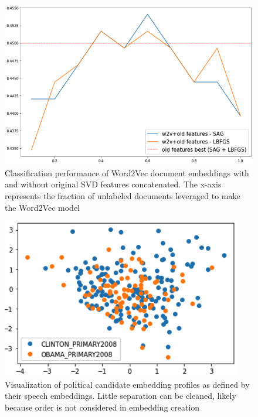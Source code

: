 \documentclass[11pt,a4paper]{article}
\begin{document}
\begin{figure}[htpb]
  \centering
  \includegraphics[width=1\linewidth]{imgs/w2v_classification.png}
  \caption{Classification performance of Word2Vec document embeddings with
  and without original SVD features concatenated. The x-axis represents
the fraction of unlabeled documents leveraged to make the Word2Vec model}%
  \label{fig:imgs/w2v_classification}
\end{figure}



\begin{figure}[htpb]
  \centering
  \includegraphics[width=1\linewidth]{imgs/PCA_w2v_Obama.png}
  \caption{Visualization of political candidate embedding profiles
  as defined by their speech embeddings. Little separation can be cleaned,
likely because order is not considered in embedding creation}%
  \label{fig:imgs/PCA_w2v_Obama}
\end{figure}
\end{document}
